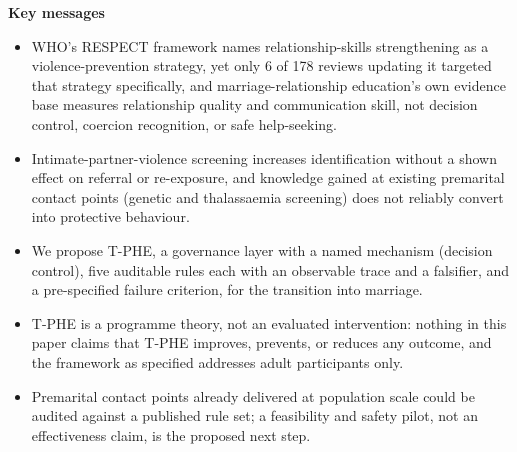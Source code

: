 \documentclass[11pt]{article}
\newcommand{\tphe}{T\mbox{-}PHE}
\begin{document}
\begin{center}
\begin{minipage}{0.94\textwidth}
\footnotesize
\noindent\textbf{Key messages}
\begin{itemize}
\item WHO's RESPECT framework names relationship-skills strengthening as a violence-prevention strategy, yet only 6 of 178 reviews updating it targeted that strategy specifically, and marriage-relationship education's own evidence base measures relationship quality and communication skill, not decision control, coercion recognition, or safe help-seeking.
\item Intimate-partner-violence screening increases identification without a shown effect on referral or re-exposure, and knowledge gained at existing premarital contact points (genetic and thalassaemia screening) does not reliably convert into protective behaviour.
\item We propose \tphe{}, a governance layer with a named mechanism (decision control), five auditable rules each with an observable trace and a falsifier, and a pre-specified failure criterion, for the transition into marriage.
\item \tphe{} is a programme theory, not an evaluated intervention: nothing in this paper claims that \tphe{} improves, prevents, or reduces any outcome, and the framework as specified addresses adult participants only.
\item Premarital contact points already delivered at population scale could be audited against a published rule set; a feasibility and safety pilot, not an effectiveness claim, is the proposed next step.
\end{itemize}
\end{minipage}
\end{center}
\vspace{3mm}
\end{document}
